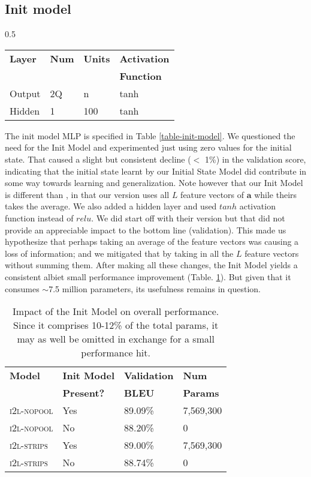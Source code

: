 \subsection{Init model}
\label{init-model-comments}
\begin{wraptable}{}{0.5\textwidth}
	\caption{Init Model layers.}
	\begin{tabular}{llll}
		\textbf{Layer} & \textbf{Num} & \textbf{Units} & \textbf{Activation} \\
		&&&\textbf{Function}\\
		\hline
		Output & 2Q & n & tanh \\
		Hidden & 1 & 100 & tanh
	\end{tabular}
	\centering
	\label{table-init-model}
\end{wraptable}
The init model MLP is specified in Table \ref{table-init-model}. We questioned the need for the Init Model and experimented just using zero values for the initial state. That caused a slight but consistent decline ($<$ 1\%) in the validation score, indicating that the initial state learnt by our Initial State Model did contribute in some way towards learning and generalization. Note however that our Init Model is different than \citealp{Xu2015ShowAA}, in that our version uses all $L$ feature vectors of $\boldsymbol{a}$ while theirs takes the average. We also added a hidden layer and used $tanh$ activation function instead of $relu$. We did start off with their version but that did not provide an appreciable impact to the bottom line (validation). This made us hypothesize that perhaps taking an average of the feature vectors was causing a loss of information; and we mitigated that by taking in all the $L$ feature vectors without summing them. After making all these changes, the Init Model yields a consistent albiet small performance improvement (Table. \ref{table-init-efficacy}). But given that it consumes $\sim$7.5 million parameters, its usefulness remains in question.
\begin{table}[h]
	\caption{Impact of the Init Model on overall performance. Since it comprises 10-12\% of the total params, it may as well be omitted in exchange for a small performance hit.}
	\begin{tabular}{llll}
		\textbf{Model} & \textbf{Init Model} & \textbf{Validation} & \textbf{Num}\\
		& \textbf{Present?} & \textbf{BLEU} & \textbf{Params} \\
		\hline
		\textsc{i2l-nopool} & Yes & 89.09\% & 7,569,300 \\
		\textsc{i2l-nopool} & No & 88.20\% & 0\\
		\textsc{i2l-strips} & Yes & 89.00\% & 7,569,300 \\
		\textsc{i2l-strips} & No & 88.74\% & 0
	\end{tabular}
	\centering
	\label{table-init-efficacy}
\end{table}

